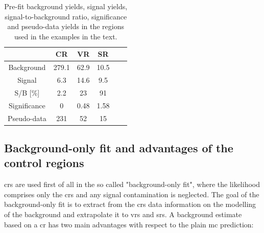 \begin{table}
\centering
\begin{tabular}{|c|c|c|c|c|c|}
\hline 
 & CR & VR & SR  \\ 
\hline 
Background & 279.1 & 62.9 & 10.5  \\ 
\hline 
Signal & 6.3 & 14.6 & 9.5 \\ 
\hline 
S/B [\%] & 2.2 & 23 & 91 \\ 
\hline 
Significance & 0 & 0.48 & 1.58 \\ 
\hline 
Pseudo-data & 231 & 52 & 15 \\ 
\hline 
\end{tabular} 
\caption{Pre-fit background yields, signal yields, signal-to-background ratio, significance and pseudo-data yields in the regions used in the examples in the text.}
\label{tab:stat:exampleyeilds}
\end{table}

\subsection{Background-only fit and advantages of the control regions}
\label{sec:example_cr}

\glspl{cr} are used first of all in the so called "background-only fit", where the likelihood comprises only the \glspl{cr} and any signal contamination is neglected. The goal of the background-only fit is to extract from the \glspl{cr} data information on the modelling of the background 
and extrapolate it to \glspl{vr} and \glspl{sr}. A background estimate based on a \gls{cr} has two main advantages with respect to the plain \gls{mc} prediction:

